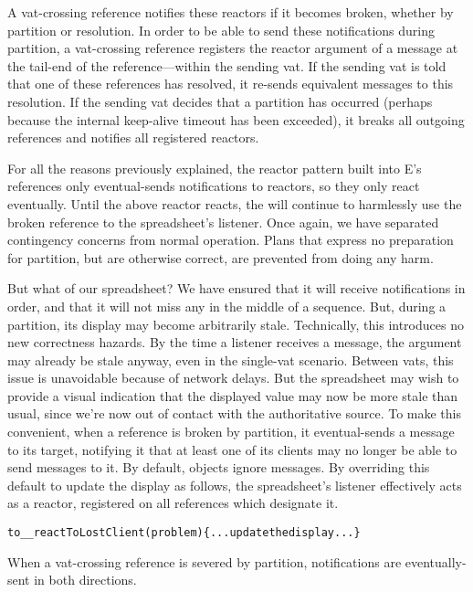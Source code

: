 \documentclass{llncs}
\begin{document}
A vat-crossing reference notifies these reactors if it becomes broken,
whether by partition or resolution. In order to be able to send these
notifications during partition, a vat-crossing reference registers the
reactor argument of a  message at the tail-end of
the reference---within the sending vat. If the sending vat is told
that one of these references has resolved, it re-sends equivalent
 messages to this resolution. If the sending vat
decides that a partition has occurred (perhaps because the internal
keep-alive timeout has been exceeded), it breaks all outgoing
references and notifies all registered reactors.

For all the reasons previously explained, the reactor pattern built
into E's references only eventual-sends notifications to reactors, so
they only react eventually. Until the above reactor reacts, the
 will continue to harmlessly use the broken
reference to the spreadsheet's listener. Once again, we have separated
contingency concerns from normal operation. Plans that express no
preparation for partition, but are otherwise correct, are prevented
from doing any harm.

But what of our spreadsheet? We have ensured that it will receive
 notifications in order, and that it will not miss
any in the middle of a sequence. But, during a partition, its display
may become arbitrarily stale. Technically, this introduces no new
correctness hazards. By the time a listener receives a
 message, the  argument may already
be stale anyway, even in the single-vat scenario. Between vats, this
issue is unavoidable because of network delays. But the spreadsheet
may wish to provide a visual indication that the displayed value may
now be more stale than usual, since we're now out of contact with the
authoritative source. To make this convenient, when a reference is
broken by partition, it eventual-sends a 
message to its target, notifying it that at least one of its clients
may no longer be able to send messages to it. By default, objects
ignore  messages. By overriding this
default to update the display as follows, the spreadsheet's listener
effectively acts as a reactor, registered on all references which
designate it.
%
\begin{alltt}
    to \_\_reactToLostClient(problem) \{ ...update the display... \}
\end{alltt}
%
When a vat-crossing reference is severed by partition, notifications
are eventually-sent in both directions. 
\end{document}
